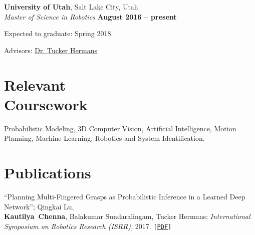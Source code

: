 \documentclass[letterpaper, margin, line]{resume}
\begin{document}
\begin{resume}
    \textbf{University of Utah}, Salt Lake City, Utah
    \vspace{0.5mm}\\\vspace{1mm}%
    \textsl{Master of Science in Robotics} \hfill \textbf{ August 2016 -- present}\vspace{-3mm}\\\vspace{-1mm}%
    \begin{list2}
        \item Expected to graduate: Spring 2018
        \item Advisors:  \href{https://www.cs.utah.edu/~thermans/}{Dr. Tucker Hermans}
    \end{list2}\vspace{-1.5mm}
	
	\section{\mysidestyle Relevant\\Coursework}
	Probabilistic Modeling, 3D Computer Vision, Artificial Intelligence, Motion Planning, Machine Learning, Robotics and System Identification.\vspace{-1mm}%
    
    
    \section{\mysidestyle Publications}
     ``Planning Multi-Fingered Grasps as Probabilistic Inference in a Learned Deep Network''; Qingkai Lu, \\
     \mbox{\bf Kautilya Chenna}, Balakumar Sundaralingam, Tucker Hermans; \textit{International Symposium on Robotics Research (ISRR),} 2017. \texttt{[\href{http://www.cs.utah.edu/~thermans/papers/lu-isrr2017-deep-multifinger-grasping.pdf}{PDF}]}
     \vspace{-1mm}%


\end{resume}
\end{document}

